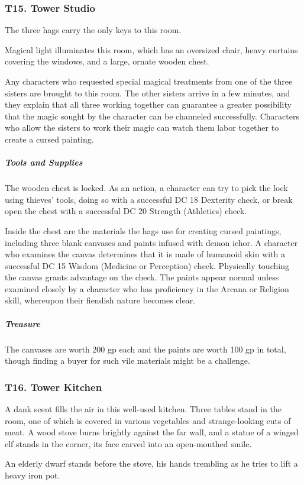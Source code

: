 \documentclass[10pt,a4paper,twoside,bg=print,twocolumn,openany,nodeprecatedcode]{dndbook}
\begin{document}
\subsubsection{T15. Tower Studio}
The three hags carry the only keys to this room.

\begin{DndReadAloud}{}
Magical light illuminates this room, which has an oversized chair, heavy curtains covering the windows, and a large, ornate wooden chest.

\end{DndReadAloud}

Any characters who requested special magical treatments from one of the three sisters are brought to this room. The other sisters arrive in a few minutes, and they explain that all three working together can guarantee a greater possibility that the magic sought by the character can be channeled successfully. Characters who allow the sisters to work their magic can watch them labor together to create a cursed painting.

\subparagraph{Tools and Supplies}
The wooden chest is locked. As an action, a character can try to pick the lock using thieves' tools, doing so with a successful DC 18 Dexterity check, or break open the chest with a successful DC 20 Strength (Athletics) check.

Inside the chest are the materials the hags use for creating cursed paintings, including three blank canvases and paints infused with demon ichor. A character who examines the canvas determines that it is made of humanoid skin with a successful DC 15 Wisdom (Medicine or Perception) check. Physically touching the canvas grants advantage on the check. The paints appear normal unless examined closely by a character who has proficiency in the Arcana or Religion skill, whereupon their fiendish nature becomes clear.

\subparagraph{Treasure}
The canvases are worth 200 gp each and the paints are worth 100 gp in total, though finding a buyer for such vile materials might be a challenge.

\subsubsection{T16. Tower Kitchen}
\begin{DndReadAloud}{}
A dank scent fills the air in this well-used kitchen. Three tables stand in the room, one of which is covered in various vegetables and strange-looking cuts of meat. A wood stove burns brightly against the far wall, and a statue of a winged elf stands in the corner, its face carved into an open-mouthed smile.

An elderly dwarf stands before the stove, his hands trembling as he tries to lift a heavy iron pot.

\end{DndReadAloud}
\end{document}
